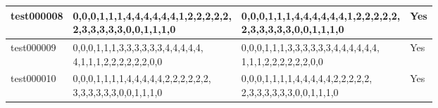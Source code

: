 \begin{table}[ht!]
\begin{center}
\begin{tabular}{| l | l | l | l |}
test000008 & \specialcell{0,0,0,1,1,1,4,4,4,4,4,4,1,2,2,2,2,2, \\ 2,3,3,3,3,3,0,0,1,1,1,0}  & \specialcell{0,0,0,1,1,1,4,4,4,4,4,4,1,2,2,2,2,2, \\ 2,3,3,3,3,3,0,0,1,1,1,0} & Yes  \\ \hline
test000009 & \specialcell{0,0,0,1,1,1,3,3,3,3,3,3,4,4,4,4,4, \\ 4,1,1,1,2,2,2,2,2,2,0,0}  & \specialcell{0,0,0,1,1,1,3,3,3,3,3,3,4,4,4,4,4,4, \\ 1,1,1,2,2,2,2,2,2,0,0} & Yes \\ \hline
test000010 & \specialcell{0,0,0,1,1,1,1,4,4,4,4,4,2,2,2,2,2,2, \\ 3,3,3,3,3,3,0,0,1,1,1,0}    & \specialcell{0,0,0,1,1,1,1,4,4,4,4,4,2,2,2,2,2, \\ 2,3,3,3,3,3,3,0,0,1,1,1,0}  & Yes \\ \hline

\hline
\end{tabular}
\end{center}
\end{table}
\vspace{3em}